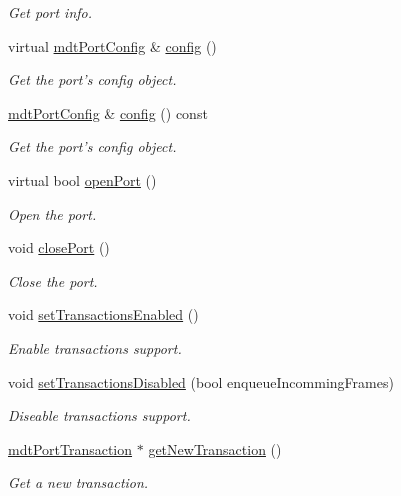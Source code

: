\begin{DoxyCompactItemize}
\begin{DoxyCompactList}\small\item\em Get port info. \end{DoxyCompactList}\item 
virtual \hyperlink{classmdt_port_config}{mdtPortConfig} \& \hyperlink{classmdt_port_manager_a9cf3ea2da38f81682695b37448712ffd}{config} ()
\begin{DoxyCompactList}\small\item\em Get the port's config object. \end{DoxyCompactList}\item 
\hyperlink{classmdt_port_config}{mdtPortConfig} \& \hyperlink{classmdt_port_manager_a735b7dc766fc2f45fb2cf9772c4201b0}{config} () const 
\begin{DoxyCompactList}\small\item\em Get the port's config object. \end{DoxyCompactList}\item 
virtual bool \hyperlink{classmdt_port_manager_aab594613e8985590c835194efbc27b5e}{openPort} ()
\begin{DoxyCompactList}\small\item\em Open the port. \end{DoxyCompactList}\item 
void \hyperlink{classmdt_port_manager_ace8065f1f5083041ee7f65c2892bc77d}{closePort} ()
\begin{DoxyCompactList}\small\item\em Close the port. \end{DoxyCompactList}\item 
void \hyperlink{classmdt_port_manager_a7f0bc97ad55160ea09b9079dd6d816d4}{setTransactionsEnabled} ()
\begin{DoxyCompactList}\small\item\em Enable transactions support. \end{DoxyCompactList}\item 
void \hyperlink{classmdt_port_manager_a40f6d2a420d1ce103af207237c45901a}{setTransactionsDisabled} (bool enqueueIncommingFrames)
\begin{DoxyCompactList}\small\item\em Diseable transactions support. \end{DoxyCompactList}\item 
\hyperlink{classmdt_port_transaction}{mdtPortTransaction} $\ast$ \hyperlink{classmdt_port_manager_a75ebd3d1859e3ed38b9558981e53aac4}{getNewTransaction} ()
\begin{DoxyCompactList}\small\item\em Get a new transaction. \end{DoxyCompactList}\item 

\end{DoxyCompactItemize}
